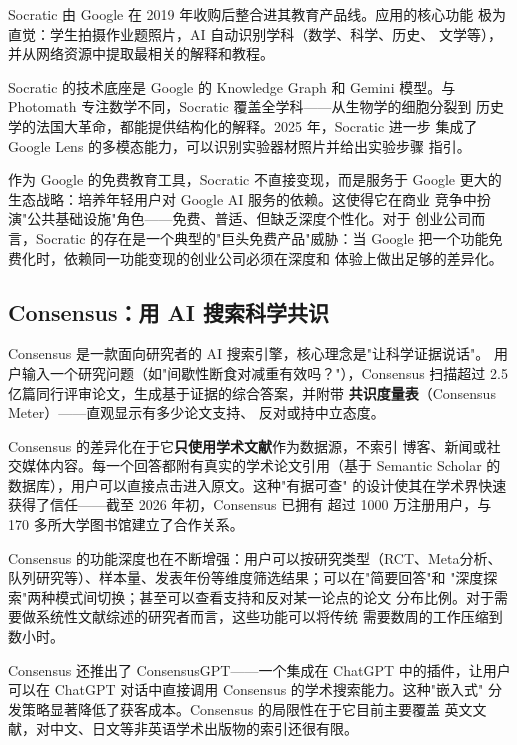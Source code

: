 Socratic 由 Google 在 2019 年收购后整合进其教育产品线。应用的核心功能
极为直觉：学生拍摄作业题照片，AI 自动识别学科（数学、科学、历史、
文学等），并从网络资源中提取最相关的解释和教程。

Socratic 的技术底座是 Google 的 Knowledge Graph 和 Gemini 模型。与
Photomath 专注数学不同，Socratic 覆盖全学科——从生物学的细胞分裂到
历史学的法国大革命，都能提供结构化的解释。2025 年，Socratic 进一步
集成了 Google Lens 的多模态能力，可以识别实验器材照片并给出实验步骤
指引。

作为 Google 的免费教育工具，Socratic 不直接变现，而是服务于 Google
更大的生态战略：培养年轻用户对 Google AI 服务的依赖。这使得它在商业
竞争中扮演"公共基础设施"角色——免费、普适、但缺乏深度个性化。对于
创业公司而言，Socratic 的存在是一个典型的"巨头免费产品"威胁：当
Google 把一个功能免费化时，依赖同一功能变现的创业公司必须在深度和
体验上做出足够的差异化。


\subsection{Consensus：用 AI 搜索科学共识}
\label{subsec:ch08-consensus}

Consensus 是一款面向研究者的 AI 搜索引擎，核心理念是"让科学证据说话"。
用户输入一个研究问题（如"间歇性断食对减重有效吗？"），Consensus
扫描超过 2.5 亿篇同行评审论文，生成基于证据的综合答案，并附带
\textbf{共识度量表}（Consensus Meter）——直观显示有多少论文支持、
反对或持中立态度。

Consensus 的差异化在于它\textbf{只使用学术文献}作为数据源，不索引
博客、新闻或社交媒体内容。每一个回答都附有真实的学术论文引用（基于
Semantic Scholar 的数据库），用户可以直接点击进入原文。这种"有据可查"
的设计使其在学术界快速获得了信任——截至 2026 年初，Consensus 已拥有
超过 1000 万注册用户，与 170 多所大学图书馆建立了合作关系。

Consensus 的功能深度也在不断增强：用户可以按研究类型（RCT、Meta分析、
队列研究等）、样本量、发表年份等维度筛选结果；可以在"简要回答"和
"深度探索"两种模式间切换；甚至可以查看支持和反对某一论点的论文
分布比例。对于需要做系统性文献综述的研究者而言，这些功能可以将传统
需要数周的工作压缩到数小时。

Consensus 还推出了 ConsensusGPT——一个集成在 ChatGPT 中的插件，让用户
可以在 ChatGPT 对话中直接调用 Consensus 的学术搜索能力。这种"嵌入式"
分发策略显著降低了获客成本。Consensus 的局限性在于它目前主要覆盖
英文文献，对中文、日文等非英语学术出版物的索引还很有限。


